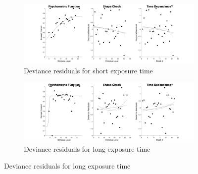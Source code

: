 \documentclass{article}
\begin{document}
\begin{figure}[!hb]
    \begin{subfigure}{\textwidth}
        \centering
        \includegraphics[width = \linewidth]{Thesis/plots/gof/segSize/segSize_re_short_deviance.png}
        \caption{Deviance residuals for short exposure time}
    \end{subfigure}
    
    \begin{subfigure}{\textwidth}
        \centering
        \includegraphics[width = \linewidth]{Thesis/plots/gof/segSize/segSize_re_long_deviance.png}
        \caption{Deviance residuals for long exposure time}
    \end{subfigure}
\end{figure}

\clearpage
\end{document}
